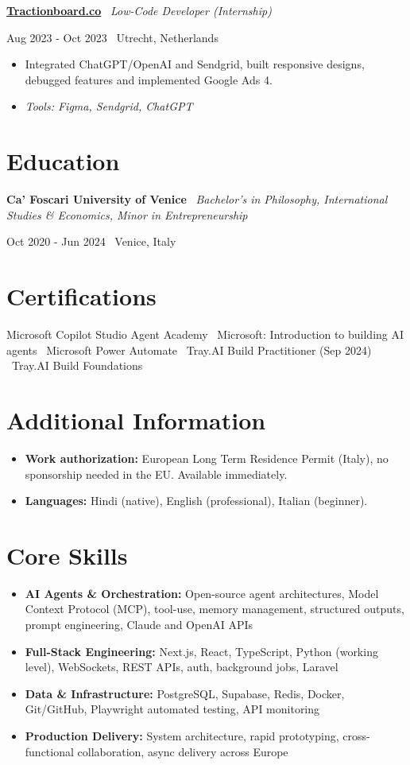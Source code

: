 \documentclass[a4paper,10pt]{article}
\newcommand{\role}[4]{%
 \vspace{2pt}\noindent
 \begin{minipage}[t]{0.70\textwidth}\raggedright\textbf{#1} \textbullet\ \textit{#3}\end{minipage}%
 \hfill
 \begin{minipage}[t]{0.28\textwidth}\raggedleft\footnotesize\color{gray}#2 \textbullet\ #4\end{minipage}%
 \vspace{1pt}%
}
\begin{document}
\role{\href{https://tractionboard.co}{Tractionboard.co}}{Aug 2023 - Oct 2023}{Low-Code Developer (Internship)}{Utrecht, Netherlands}
\begin{itemize}
 \item Integrated ChatGPT/OpenAI and Sendgrid, built responsive designs, debugged features and implemented Google Ads 4.
 \item \textit{Tools: Figma, Sendgrid, ChatGPT}
\end{itemize}

\section{Education}
\role{Ca' Foscari University of Venice}{Oct 2020 - Jun 2024}{Bachelor's in Philosophy, International Studies \& Economics, Minor in Entrepreneurship}{Venice, Italy}

\section{Certifications}
Microsoft Copilot Studio Agent Academy \textbullet\ Microsoft: Introduction to building AI agents \textbullet\ Microsoft Power Automate \textbullet\ Tray.AI Build Practitioner (Sep 2024) \textbullet\ Tray.AI Build Foundations

\section{Additional Information}
\begin{itemize}
 \item \textbf{Work authorization:} European Long Term Residence Permit (Italy), no sponsorship needed in the EU. Available immediately.
 \item \textbf{Languages:} Hindi (native), English (professional), Italian (beginner).
\end{itemize}

\section{Core Skills}
\begin{itemize}
 \item \textbf{AI Agents \& Orchestration:} Open-source agent architectures, Model Context Protocol (MCP), tool-use, memory management, structured outputs, prompt engineering, Claude and OpenAI APIs
 \item \textbf{Full-Stack Engineering:} Next.js, React, TypeScript, Python (working level), WebSockets, REST APIs, auth, background jobs, Laravel
 \item \textbf{Data \& Infrastructure:} PostgreSQL, Supabase, Redis, Docker, Git/GitHub, Playwright automated testing, API monitoring
 \item \textbf{Production Delivery:} System architecture, rapid prototyping, cross-functional collaboration, async delivery across Europe
\end{itemize}
\end{document}

